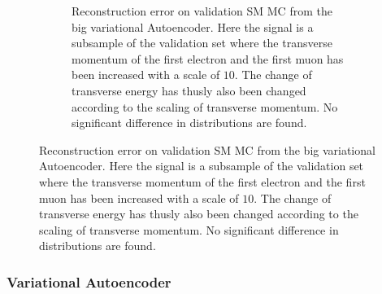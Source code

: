 \begin{figure}[h!]
\begin{subfigure}{.45\textwidth}
        \caption{Reconstruction error on validation SM MC from the big variational Autoencoder. Here the signal is a subsample of the validation 
        set where the transverse momentum of the first electron and the first muon has been increased with a scale of $10$. The change of transverse 
        energy has thusly also been changed according to the scaling of transverse momentum. No significant difference in distributions are found. }
        \label{fig:ae_big_pt_10}
    \end{subfigure}
    \hfill 
    \label{fig:ae_big_small_pt_10}
\end{figure}



\subsubsection*{Variational Autoencoder}

